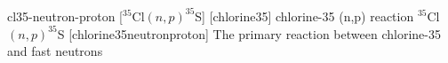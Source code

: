 \newglsXreaction%
{cl35-neutron-proton}%
[{}$^{35}$Cl$(n,p)^{35}$S]%
[chlorine35]%
{chlorine-35 (n,p) reaction}%
{{}$^{35}$Cl$(n,p)^{35}$S}%
[chlorine35neutronproton]%
{The primary reaction between chlorine-35 and fast neutrons}%